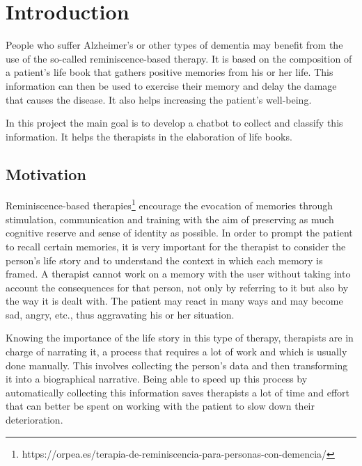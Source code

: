\chapter{Introduction}
\label{cap:introduction}


People who suffer Alzheimer's or other types of dementia may benefit from the use of the  so-called reminiscence-based therapy. It is based on the composition of a patient's life book that gathers positive memories from his or her life. This information can then be used to exercise their memory and delay the damage that causes the disease. It also helps increasing the patient's well-being.

In this project the main goal is to develop a chatbot to collect and classify this information. It helps the therapists in the elaboration of life books.


\section{Motivation}

Reminiscence-based therapies\footnote{https://orpea.es/terapia-de-reminiscencia-para-personas-con-demencia/} encourage the evocation of memories through stimulation, communication and training with the aim of preserving as much cognitive reserve and sense of identity as possible. In order to prompt the patient to recall certain memories, it is very important for the therapist to consider the person's life story and to understand the context in which each memory is framed. A therapist cannot work on a memory with the user without taking into account the consequences for that person, not only by referring to it but also by the way it is dealt with. The patient may react in many ways and may become sad, angry, etc., thus aggravating his or her situation.

Knowing the importance of the life story in this type of therapy, therapists are in charge of narrating it, a process that requires a lot of work and which is usually done manually. This involves collecting the person's data and then transforming it into a biographical narrative. Being able to speed up this process by automatically collecting this information saves therapists a lot of time and effort that can better be spent on working with the patient to slow down their deterioration.

